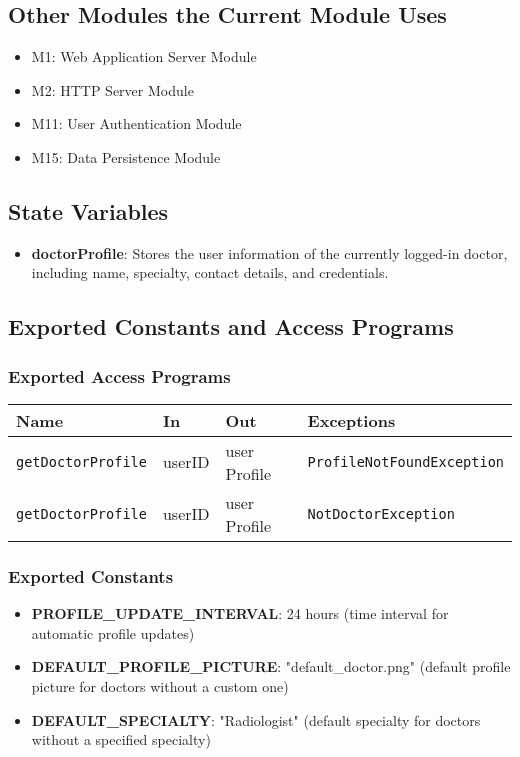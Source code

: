 \documentclass[12pt, titlepage]{article}
\begin{document}
\subsection{Other Modules the Current Module Uses}
\begin{itemize}
    \item M1: Web Application Server Module
    \item M2: HTTP Server Module
    \item M11: User Authentication Module
    \item M15: Data Persistence Module
\end{itemize}

\subsection{State Variables}
\begin{itemize}
    \item \textbf{doctorProfile}: Stores the user information of the currently logged-in doctor, including name, specialty, contact details, and credentials.
\end{itemize}

\subsection{Exported Constants and Access Programs}
\subsubsection{Exported Access Programs}
\begin{tabular}{|l|l|l|l|}
    \hline
    \textbf{Name} & \textbf{In} & \textbf{Out} & \textbf{Exceptions} \\
    \hline 
    \texttt{getDoctorProfile} & userID & user Profile & \texttt{ProfileNotFoundException} \\
    \hline
    \texttt{getDoctorProfile} & userID & user Profile & \texttt{NotDoctorException } \\
    \hline
\end{tabular}

\subsubsection{Exported Constants}
\begin{itemize}
\item \textbf{PROFILE\_UPDATE\_INTERVAL}: 24 hours (time interval for automatic profile updates)
\item \textbf{DEFAULT\_PROFILE\_PICTURE}: "default\_doctor.png" (default profile picture for doctors without a custom one)
\item \textbf{DEFAULT\_SPECIALTY}: "Radiologist" (default specialty for doctors without a specified specialty)
\end{itemize}
\end{document}
